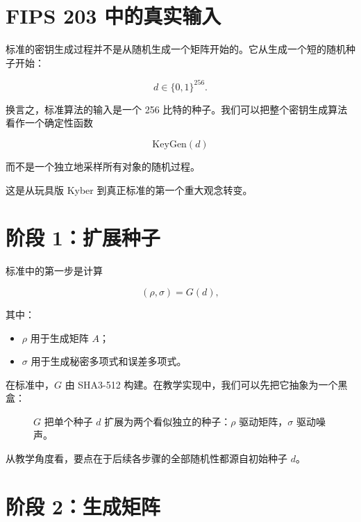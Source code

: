 \section{FIPS 203 中的真实输入}

标准的密钥生成过程并不是从随机生成一个矩阵开始的。它从生成一个短的随机种子开始：

\[
d \in \{0,1\}^{256}.
\]

换言之，标准算法的输入是一个 256 比特的种子。我们可以把整个密钥生成算法看作一个确定性函数

\[
\mathrm{KeyGen}(d)
\]

而不是一个独立地采样所有对象的随机过程。

这是从玩具版 Kyber 到真正标准的第一个重大观念转变。

\section{阶段 1：扩展种子}

标准中的第一步是计算

\[
(\rho, \sigma) = G(d),
\]

其中：

\begin{itemize}
  \item $\rho$ 用于生成矩阵 $A$；
  \item $\sigma$ 用于生成秘密多项式和误差多项式。
\end{itemize}

在标准中，$G$ 由 SHA3-512 构建。在教学实现中，我们可以先把它抽象为一个黑盒：

\begin{figure}[H]
\centering
{}
\caption{$G$ 把单个种子 $d$ 扩展为两个看似独立的种子：$\rho$ 驱动矩阵，$\sigma$ 驱动噪声。}
\label{fig:seed-expand-g}
\end{figure}

从教学角度看，要点在于后续各步骤的全部随机性都源自初始种子 $d$。

\section{阶段 2：生成矩阵}

